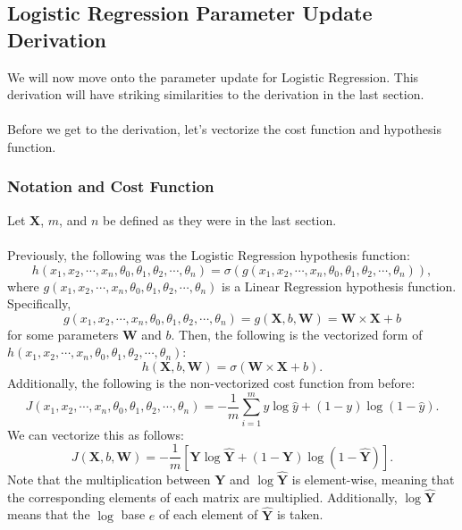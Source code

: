 \documentclass{article}
\begin{document}
\subsection{Logistic Regression Parameter Update Derivation}
We will now move onto the parameter update for Logistic Regression. This derivation will have striking similarities to the derivation in the last section.
\\
\\
Before we get to the derivation, let's vectorize the cost function and hypothesis function.
\subsubsection{Notation and Cost Function}
Let \textbf{X}, $m$, and $n$ be defined as they were in the last section.
\\
\\
Previously, the following was the Logistic Regression hypothesis function:
\[h(x_1,x_2,\cdots,x_n,\theta_0,\theta_1,\theta_2,\cdots,\theta_n)=\sigma(g(x_1,x_2,\cdots,x_n,\theta_0,\theta_1,\theta_2,\cdots,\theta_n)),\]
where $g(x_1,x_2,\cdots,x_n,\theta_0,\theta_1,\theta_2,\cdots,\theta_n)$ is a Linear Regression hypothesis function. Specifically,
\[g(x_1,x_2,\cdots,x_n,\theta_0,\theta_1,\theta_2,\cdots,\theta_n)=g(\textbf{X},b,\textbf{W})=\textbf{W}\times \textbf{X}+b\]
for some parameters \textbf{W} and $b$. Then, the following is the vectorized form of $h(x_1,x_2,\cdots,x_n,\theta_0,\theta_1,\theta_2,\cdots,\theta_n)$:
\[h(\textbf{X},b,\textbf{W})=\sigma(\textbf{W}\times \textbf{X}+b).\]
Additionally, the following is the non-vectorized cost function from before: 
\[J(x_1,x_2,\cdots,x_n,\theta_0,\theta_1,\theta_2,\cdots,\theta_n)=-\frac{1}{m}\sum_{i=1}^m y\log{\hat{y}}+(1-y)\log{(1-\hat{y})}.\]
We can vectorize this as follows:
\[J(\textbf{X},b,\textbf{W})=-\frac{1}{m}\left[\textbf{Y}\log{\hat{\textbf{Y}}}+(1-\textbf{Y})\log{(1-\hat{\textbf{Y}})}\right].\]
Note that the multiplication between $\textbf{Y}$ and $\log{\hat{\textbf{Y}}}$ is element-wise, meaning that the corresponding elements of each matrix are multiplied. Additionally, $\log{\hat{\textbf{Y}}}$ means that the $\log$ base $e$ of each element of $\hat{\textbf{Y}}$ is taken.
\end{document}
